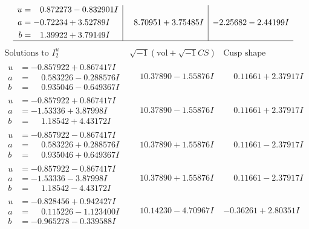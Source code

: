 \documentclass[1p]{elsarticle_modified}
\theoremstyle{definition}
\newcommand{\I}{\sqrt{-1}}
\begin{document}
$$\begin{array}{c|c|c}
\begin{aligned}
u &= \phantom{-}0.872273 - 0.832901 I \\
a &= -0.72234 + 3.52789 I \\
b &= \phantom{-}1.39922 + 3.79149 I\end{aligned}
 & \phantom{-}8.70951 + 3.75485 I & -2.25682 - 2.44199 I\\
 \hline 
 \end{array}$$\newpage$$\begin{array}{c|c|c}  
\text{Solutions to }I^u_{2}& \I (\text{vol} + \sqrt{-1}CS) & \text{Cusp shape}\\
 \hline 
\begin{aligned}
u &= -0.857922 + 0.867417 I \\
a &= \phantom{-}0.583226 - 0.288576 I \\
b &= \phantom{-}0.935046 - 0.649367 I\end{aligned}
 & \phantom{-}10.37890 - 1.55876 I & \phantom{-}0.11661 + 2.37917 I \\ \hline\begin{aligned}
u &= -0.857922 + 0.867417 I \\
a &= -1.53336 + 3.87998 I \\
b &= \phantom{-}1.18542 + 4.43172 I\end{aligned}
 & \phantom{-}10.37890 - 1.55876 I & \phantom{-}0.11661 + 2.37917 I \\ \hline\begin{aligned}
u &= -0.857922 - 0.867417 I \\
a &= \phantom{-}0.583226 + 0.288576 I \\
b &= \phantom{-}0.935046 + 0.649367 I\end{aligned}
 & \phantom{-}10.37890 + 1.55876 I & \phantom{-}0.11661 - 2.37917 I \\ \hline\begin{aligned}
u &= -0.857922 - 0.867417 I \\
a &= -1.53336 - 3.87998 I \\
b &= \phantom{-}1.18542 - 4.43172 I\end{aligned}
 & \phantom{-}10.37890 + 1.55876 I & \phantom{-}0.11661 - 2.37917 I \\ \hline\begin{aligned}
u &= -0.828456 + 0.942427 I \\
a &= \phantom{-}0.115226 - 1.123400 I \\
b &= -0.965278 - 0.339588 I\end{aligned}
 & \phantom{-}10.14230 - 4.70967 I & -0.36261 + 2.80351 I \\ \hline\begin{aligned}

\end{aligned}
\end{array}$$
\end{document}
